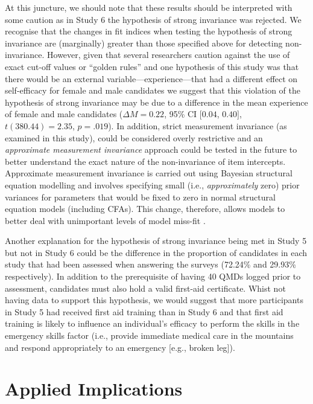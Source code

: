 \documentclass[
  12pt,
  a4paper,
]{book}
\begin{document}
At this juncture, we should note that these results should be interpreted with some caution as in Study 6 the hypothesis of strong invariance was rejected. We recognise that the changes in fit indices when testing the hypothesis of strong invariance are (marginally) greater than those specified above for detecting non-invariance. However, given that several researchers caution against the use of exact cut-off values or ``golden rules'' \citep[e.g.,][]{Kline2016, Markland2007} and one hypothesis of this study was that there would be an external variable---experience---that had a different effect on self-efficacy for female and male candidates we suggest that this violation of the hypothesis of strong invariance may be due to a difference in the mean experience of female and male candidates (\(\Delta M = 0.22\), 95\% CI \([0.04\), \(0.40]\), \(t(380.44) = 2.35\), \(p = .019\)). In addition, strict measurement invariance (as examined in this study), could be considered overly restrictive \citep[cf.~][]{Muthen2012} and an \emph{approximate measurement invariance} approach could be tested in the future to better understand the exact nature of the non-invariance of item intercepts. Approximate measurement invariance is carried out using Bayesian structural equation modelling and involves specifying small (i.e., \emph{approximately} zero) prior variances for parameters that would be fixed to zero in normal structural equation models (including CFAs). This change, therefore, allows models to better deal with unimportant levels of model miss-fit \citep[cf.~][]{Muthen2012, VandeSchoot2013}.

Another explanation for the hypothesis of strong invariance being met in Study 5 but not in Study 6 could be the difference in the proportion of candidates in each study that had been assessed when answering the surveys (72.24\% and 29.93\% respectively). In addition to the prerequisite of having 40 QMDs logged prior to assessment, candidates must also hold a valid first-aid certificate. Whist not having data to support this hypothesis, we would suggest that more participants in Study 5 had received first aid training than in Study 6 and that first aid training is likely to influence an individual's efficacy to perform the skills in the emergency skills factor (i.e., provide immediate medical care in the mountains and respond appropriately to an emergency {[}e.g., broken leg{]}).

\hypertarget{self-efficacy-applied-implications}{%
\section{Applied Implications}\label{self-efficacy-applied-implications}}
\end{document}
